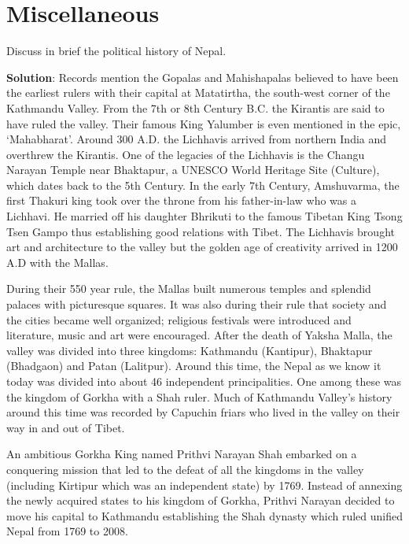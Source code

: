 \documentclass[
  openany]{book}
\newcommand{\question}{\item}
\newenvironment{solution}{ {\bfseries Solution}:}{}
\begin{document}
\hypertarget{miscellaneous-1}{%
\section{Miscellaneous}\label{miscellaneous-1}}

\begin{questions}

\question Discuss in brief the political history of Nepal.

\begin{solution}
Records mention the Gopalas and Mahishapalas believed to have been the earliest rulers with their capital at Matatirtha, the south-west corner of the Kathmandu Valley. From the 7th or 8th Century B.C. the Kirantis are said to have ruled the valley. Their famous King Yalumber is even mentioned in the epic, ‘Mahabharat’. Around 300 A.D. the Lichhavis arrived from northern India and overthrew the Kirantis. One of the legacies of the Lichhavis is the Changu Narayan Temple near Bhaktapur, a UNESCO World Heritage Site (Culture), which dates back to the 5th Century. In the early 7th Century, Amshuvarma, the first Thakuri king took over the throne from his father-in-law who was a Lichhavi. He married off his daughter Bhrikuti to the famous Tibetan King Tsong Tsen Gampo thus establishing good relations with Tibet. The Lichhavis brought art and architecture to the valley but the golden age of creativity arrived in 1200 A.D with the Mallas.

During their 550 year rule, the Mallas built numerous temples and splendid palaces with picturesque squares. It was also during their rule that society and the cities became well organized; religious festivals were introduced and literature, music and art were encouraged. After the death of Yaksha Malla, the valley was divided into three kingdoms: Kathmandu (Kantipur), Bhaktapur (Bhadgaon) and Patan (Lalitpur). Around this time, the Nepal as we know it today was divided into about 46 independent principalities. One among these was the kingdom of Gorkha with a Shah ruler. Much of Kathmandu Valley’s history around this time was recorded by Capuchin friars who lived in the valley on their way in and out of Tibet.

An ambitious Gorkha King named Prithvi Narayan Shah embarked on a conquering mission that led to the defeat of all the kingdoms in the valley (including Kirtipur which was an independent state) by 1769. Instead of annexing the newly acquired states to his kingdom of Gorkha, Prithvi Narayan decided to move his capital to Kathmandu establishing the Shah dynasty which ruled unified Nepal from 1769 to 2008.


\end{solution}
\end{questions}
\end{document}
